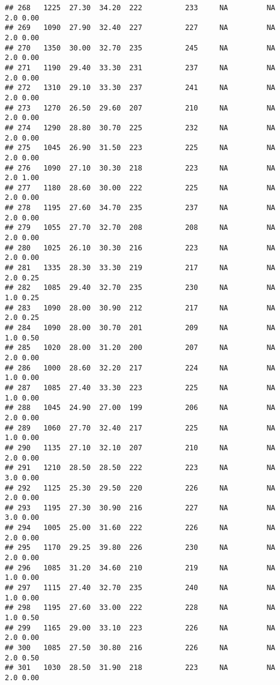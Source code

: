 \documentclass[
]{article}
\begin{document}
\begin{verbatim}
## 268   1225  27.30  34.20  222          233     NA         NA     2.0 0.00
## 269   1090  27.90  32.40  227          227     NA         NA     2.0 0.00
## 270   1350  30.00  32.70  235          245     NA         NA     2.0 0.00
## 271   1190  29.40  33.30  231          237     NA         NA     2.0 0.00
## 272   1310  29.10  33.30  237          241     NA         NA     2.0 0.00
## 273   1270  26.50  29.60  207          210     NA         NA     2.0 0.00
## 274   1290  28.80  30.70  225          232     NA         NA     2.0 0.00
## 275   1045  26.90  31.50  223          225     NA         NA     2.0 0.00
## 276   1090  27.10  30.30  218          223     NA         NA     2.0 1.00
## 277   1180  28.60  30.00  222          225     NA         NA     2.0 0.00
## 278   1195  27.60  34.70  235          237     NA         NA     2.0 0.00
## 279   1055  27.70  32.70  208          208     NA         NA     2.0 0.00
## 280   1025  26.10  30.30  216          223     NA         NA     2.0 0.00
## 281   1335  28.30  33.30  219          217     NA         NA     2.0 0.25
## 282   1085  29.40  32.70  235          230     NA         NA     1.0 0.25
## 283   1090  28.00  30.90  212          217     NA         NA     2.0 0.25
## 284   1090  28.00  30.70  201          209     NA         NA     1.0 0.50
## 285   1020  28.00  31.20  200          207     NA         NA     2.0 0.00
## 286   1000  28.60  32.20  217          224     NA         NA     1.0 0.00
## 287   1085  27.40  33.30  223          225     NA         NA     1.0 0.00
## 288   1045  24.90  27.00  199          206     NA         NA     2.0 0.00
## 289   1060  27.70  32.40  217          225     NA         NA     1.0 0.00
## 290   1135  27.10  32.10  207          210     NA         NA     2.0 0.00
## 291   1210  28.50  28.50  222          223     NA         NA     3.0 0.00
## 292   1125  25.30  29.50  220          226     NA         NA     2.0 0.00
## 293   1195  27.30  30.90  216          227     NA         NA     3.0 0.00
## 294   1005  25.00  31.60  222          226     NA         NA     2.0 0.00
## 295   1170  29.25  39.80  226          230     NA         NA     2.0 0.00
## 296   1085  31.20  34.60  210          219     NA         NA     1.0 0.00
## 297   1115  27.40  32.70  235          240     NA         NA     1.0 0.00
## 298   1195  27.60  33.00  222          228     NA         NA     1.0 0.50
## 299   1165  29.00  33.10  223          226     NA         NA     2.0 0.00
## 300   1085  27.50  30.80  216          226     NA         NA     2.0 0.50
## 301   1030  28.50  31.90  218          223     NA         NA     2.0 0.00

\end{verbatim}
\end{document}
